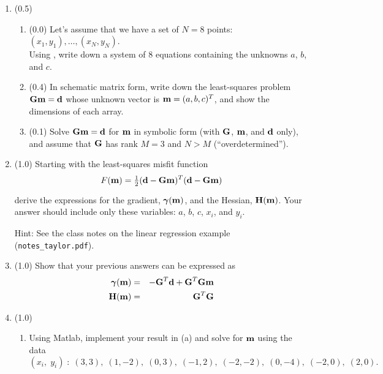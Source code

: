 \documentclass[11pt,titlepage,fleqn]{article}
\begin{document}
\begin{enumerate}
\item (0.5) 

\begin{enumerate}
\item (0.0) Let's assume that we have a set of $N=8$ points: $(x_1,y_1), \ldots, (x_N,y_N)$. \\
Using , write down a system of 8 equations containing the unknowns $a$, $b$, and $c$.

\item  (0.4) In schematic matrix form, write down the least-squares problem $\mbox{${\bf G}$}\mbox{${\bf m}$}=\mbox{${\bf d}$}$ whose unknown vector is $\mbox{${\bf m}$} = (a,b,c)^T$, and show the dimensions of each array.

\item (0.1) Solve $\mbox{${\bf G}$}\mbox{${\bf m}$}=\mbox{${\bf d}$}$ for $\mbox{${\bf m}$}$ in symbolic form (\ie with $\mbox{${\bf G}$}$, $\mbox{${\bf m}$}$, and $\mbox{${\bf d}$}$ only), and assume that $\mbox{${\bf G}$}$ has rank $M = 3$ and $N > M$ (``overdetermined'').
\end{enumerate}


\item (1.0) Starting with the least-squares misfit function
%
\begin{equation}
F(\bem) = \hlf (\bd - \bG\bem)^T(\bd - \bG\bem)
\end{equation}
%
derive the expressions for the gradient, $\mbox{\boldmath $\bf \gamma$}(\mbox{${\bf m}$})$, and the Hessian, $\mbox{${\bf H}$}(\mbox{${\bf m}$})$. Your answer should include only these variables: $a$, $b$, $c$, $x_i$, and $y_i$.

Hint: See the class notes on the linear regression example (\verb+notes_taylor.pdf+).


\item (1.0) Show that your previous answers can be expressed as
%
\begin{eqnarray}
\mbox{\boldmath $\bf \gamma$}(\mbox{${\bf m}$}) &=& -\mbox{${\bf G}$}^T\mbox{${\bf d}$} + \mbox{${\bf G}$}^T\mbox{${\bf G}$}\mbox{${\bf m}$}
\\
\mbox{${\bf H}$}(\mbox{${\bf m}$}) &=& \mbox{${\bf G}$}^T\mbox{${\bf G}$}
\end{eqnarray}


\item (1.0)
\begin{enumerate}
\item Using Matlab, implement your result in (a) and solve for $\mbox{${\bf m}$}$ using the data
%
\begin{equation*}
(x_i,\;y_i) \;:\; (3,3),\;(1,-2),\;(0,3),\;(-1,2),\;(-2,-2),\;(0,-4),\;(-2,0),\;(2,0).
\end{equation*}


\end{enumerate}
\end{enumerate}
\end{document}
